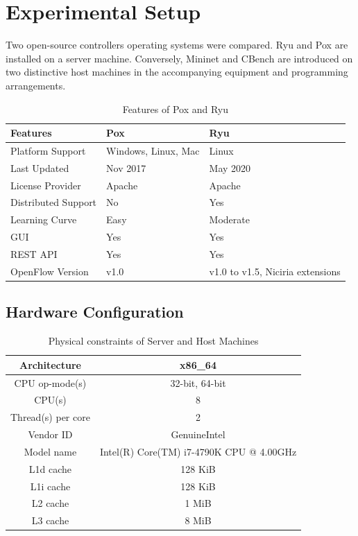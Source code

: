 \chapter{Experimental Setup}
Two open-source controllers operating systems were compared. Ryu and Pox are installed on a server machine. Conversely, Mininet and CBench are introduced on two distinctive host machines in the accompanying equipment and programming arrangements.

 \begin{table}[!hbt]
    \centering
    \caption{Features of Pox and Ryu \cite{ryuandpox}}
    \begin{tabular}{|p{4cm}|p{4cm}|p{4cm}|}
    \hline
         \textbf{Features} & \textbf{Pox} & \textbf{Ryu} \\ \hline
         Platform Support & Windows, Linux, Mac & Linux \\ \hline
    Last Updated & Nov 2017 & May 2020 \\ \hline
    License Provider & Apache & Apache \\ \hline
    Distributed Support & No & Yes \\ \hline
         Learning Curve & Easy & Moderate \\ \hline
         GUI & Yes & Yes \\ \hline
    REST API & Yes & Yes \\ \hline
    OpenFlow Version & v1.0 & v1.0 to v1.5, Niciria extensions \\ \hline
    \end{tabular}
    \label{RyuvsPox}
    \end{table}
    
\section{Hardware Configuration}
    \begin{table}[!hbt]
    \centering
    \caption{Physical constraints of Server and Host Machines}
    \begin{tabular}{|c|c|}
    \hline
    Architecture & x86\_64 \\ \hline
         CPU op-mode(s) & 32-bit, 64-bit \\ \hline
         CPU(s) & 8 \\ \hline
         Thread(s) per core & 2 \\ \hline
         Vendor ID & GenuineIntel \\ \hline
    Model name & Intel(R) Core(TM) i7-4790K CPU @ 4.00GHz \\ \hline
    L1d cache & 128 KiB \\ \hline
    L1i cache & 128 KiB \\ \hline
    L2 cache & 1 MiB \\ \hline
    L3 cache & 8 MiB \\ \hline
    \end{tabular}
    \label{Hardware}
    \end{table}

